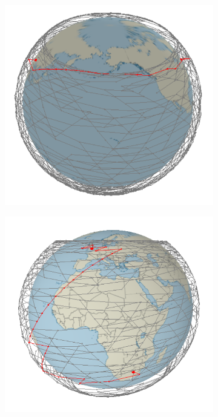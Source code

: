 \documentclass[12pt]{report}
\begin{document}
\begin{figure}
	\begin{subfigure}[b]{0.4\textwidth}
		\includegraphics[width=\textwidth]{NewYorkBeijing1320SatellitesLM2}
	\end{subfigure}
	\hfill
	\begin{subfigure}[b]{0.4\textwidth}
		\includegraphics[width=\textwidth]{LondonJohannasburg1254SatellitesLM2}
	\end{subfigure}
\end{figure}
\end{document}
